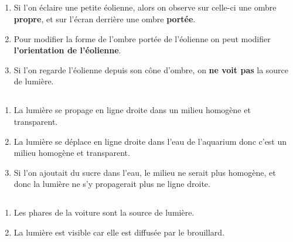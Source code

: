 \documentclass[12pt,a4paper]{article}
\begin{document}
\subsection*{}
	
\subsection*{}

\begin{enumerate}[label=\alph*)]
	\item Si l'on éclaire une petite éolienne, alors on observe sur celle-ci une ombre \textbf{propre}, et sur l'écran derrière une ombre \textbf{portée}.
	\item Pour modifier la forme de l'ombre portée de l'éolienne on peut modifier \textbf{l'orientation de l'éolienne}.
	\item Si l'on regarde l'éolienne depuis son cône d'ombre, on \textbf{ne voit pas} la source de lumière.
\end{enumerate}

\subsection*{}

	\begin{enumerate}[label=\alph*)]
		\item La lumière se propage en ligne droite dans un milieu homogène et transparent.
		\item La lumière se déplace en ligne droite dans l'eau de l'aquarium donc c'est un milieu homogène et transparent.
		\item Si l'on ajoutait du sucre dans l'eau, le milieu ne serait plus homogène, et donc la lumière ne s'y propagerait plus ne ligne droite.
	\end{enumerate}	
	
\subsection*{}
	\begin{enumerate}[label=\alph*)] 
		\item Les phares de la voiture sont la source de lumière.
		\item La lumière est visible car elle est diffusée par le brouillard.
	\end{enumerate}
\end{document}
